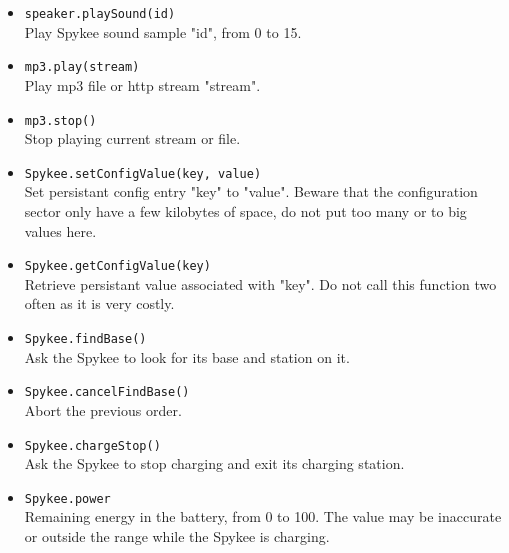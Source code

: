 \begin{itemize}
\item \lstinline|speaker.playSound(id)| \\
    Play Spykee sound sample "id", from 0 to 15.
\item \lstinline|mp3.play(stream)| \\
    Play mp3 file or http stream "stream".
\item \lstinline|mp3.stop()| \\
    Stop playing current stream or file.
\item \lstinline|Spykee.setConfigValue(key, value)| \\
    Set persistant config entry "key" to "value". Beware that the configuration
    sector only have a few kilobytes of space, do not put too many or to big
    values here.
\item \lstinline|Spykee.getConfigValue(key)| \\
    Retrieve persistant value associated with "key". Do not call this function
    two often as it is very costly.
\item \lstinline|Spykee.findBase()| \\
    Ask the Spykee to look for its base and station on it.
\item \lstinline|Spykee.cancelFindBase()| \\
    Abort the previous order.
\item \lstinline|Spykee.chargeStop()| \\
    Ask the Spykee to stop charging and exit its charging station.
\item \lstinline|Spykee.power| \\
    Remaining energy in the battery, from 0 to 100. The value may be inaccurate
    or outside the range while the Spykee is charging.
\end{itemize}
